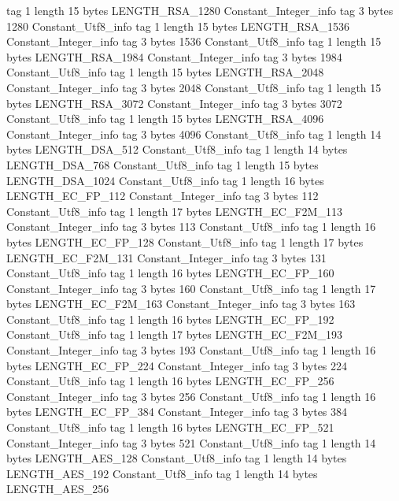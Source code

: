 {{{			tag	1
			length	15
			bytes	LENGTH_RSA_1280
		}
		Constant_Integer_info {
			tag	3
			bytes	1280
		}
		Constant_Utf8_info {
			tag	1
			length	15
			bytes	LENGTH_RSA_1536
		}
		Constant_Integer_info {
			tag	3
			bytes	1536
		}
		Constant_Utf8_info {
			tag	1
			length	15
			bytes	LENGTH_RSA_1984
		}
		Constant_Integer_info {
			tag	3
			bytes	1984
		}
		Constant_Utf8_info {
			tag	1
			length	15
			bytes	LENGTH_RSA_2048
		}
		Constant_Integer_info {
			tag	3
			bytes	2048
		}
		Constant_Utf8_info {
			tag	1
			length	15
			bytes	LENGTH_RSA_3072
		}
		Constant_Integer_info {
			tag	3
			bytes	3072
		}
		Constant_Utf8_info {
			tag	1
			length	15
			bytes	LENGTH_RSA_4096
		}
		Constant_Integer_info {
			tag	3
			bytes	4096
		}
		Constant_Utf8_info {
			tag	1
			length	14
			bytes	LENGTH_DSA_512
		}
		Constant_Utf8_info {
			tag	1
			length	14
			bytes	LENGTH_DSA_768
		}
		Constant_Utf8_info {
			tag	1
			length	15
			bytes	LENGTH_DSA_1024
		}
		Constant_Utf8_info {
			tag	1
			length	16
			bytes	LENGTH_EC_FP_112
		}
		Constant_Integer_info {
			tag	3
			bytes	112
		}
		Constant_Utf8_info {
			tag	1
			length	17
			bytes	LENGTH_EC_F2M_113
		}
		Constant_Integer_info {
			tag	3
			bytes	113
		}
		Constant_Utf8_info {
			tag	1
			length	16
			bytes	LENGTH_EC_FP_128
		}
		Constant_Utf8_info {
			tag	1
			length	17
			bytes	LENGTH_EC_F2M_131
		}
		Constant_Integer_info {
			tag	3
			bytes	131
		}
		Constant_Utf8_info {
			tag	1
			length	16
			bytes	LENGTH_EC_FP_160
		}
		Constant_Integer_info {
			tag	3
			bytes	160
		}
		Constant_Utf8_info {
			tag	1
			length	17
			bytes	LENGTH_EC_F2M_163
		}
		Constant_Integer_info {
			tag	3
			bytes	163
		}
		Constant_Utf8_info {
			tag	1
			length	16
			bytes	LENGTH_EC_FP_192
		}
		Constant_Utf8_info {
			tag	1
			length	17
			bytes	LENGTH_EC_F2M_193
		}
		Constant_Integer_info {
			tag	3
			bytes	193
		}
		Constant_Utf8_info {
			tag	1
			length	16
			bytes	LENGTH_EC_FP_224
		}
		Constant_Integer_info {
			tag	3
			bytes	224
		}
		Constant_Utf8_info {
			tag	1
			length	16
			bytes	LENGTH_EC_FP_256
		}
		Constant_Integer_info {
			tag	3
			bytes	256
		}
		Constant_Utf8_info {
			tag	1
			length	16
			bytes	LENGTH_EC_FP_384
		}
		Constant_Integer_info {
			tag	3
			bytes	384
		}
		Constant_Utf8_info {
			tag	1
			length	16
			bytes	LENGTH_EC_FP_521
		}
		Constant_Integer_info {
			tag	3
			bytes	521
		}
		Constant_Utf8_info {
			tag	1
			length	14
			bytes	LENGTH_AES_128
		}
		Constant_Utf8_info {
			tag	1
			length	14
			bytes	LENGTH_AES_192
		}
		Constant_Utf8_info {
			tag	1
			length	14
			bytes	LENGTH_AES_256
		}
}}
